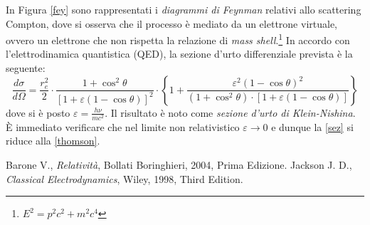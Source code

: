 \documentclass[a4paper, 12pt, oneside]{article}
\begin{document}
In Figura \ref{fey} sono rappresentati i \emph{diagrammi di Feynman} relativi allo scattering Compton, dove si osserva che il processo è mediato da un elettrone virtuale, ovvero un elettrone che non rispetta la relazione di \emph{mass shell}.\footnote{$E^2=p^2c^2+m^2c^4$} In accordo con l'elettrodinamica quantistica (QED), la sezione d'urto differenziale prevista è la seguente:
\begin{equation}\label{sez}
\frac{d\sigma}{d\Omega} = \frac{r_e^2}{2}\cdot\frac{1+\cos^2\theta}{\left[1+\varepsilon\left(1-\cos\theta\right)\right]^2}\cdot\left\{1+\frac{\varepsilon^2\left(1-\cos\theta\right)^2}{\left(1+\cos^2\theta\right)\cdot\left[1+\varepsilon\left(1-\cos\theta\right)\right]} \right\}
\end{equation}
dove si è posto $\varepsilon=\frac{h\nu}{mc^2}$. Il risultato è noto come \emph{sezione d'urto di Klein-Nishina}. \`E immediato verificare che nel limite non relativistico $\varepsilon\to 0$ e dunque la \eqref{sez} si riduce alla \eqref{thomson}.




		

\begin{thebibliography}{99}
	 Barone V., \emph{Relatività}, Bollati Boringhieri, 2004, Prima Edizione.
	 Jackson J. D., \emph{Classical Electrodynamics}, Wiley, 1998, Third Edition.
\end{thebibliography}
\end{document}
